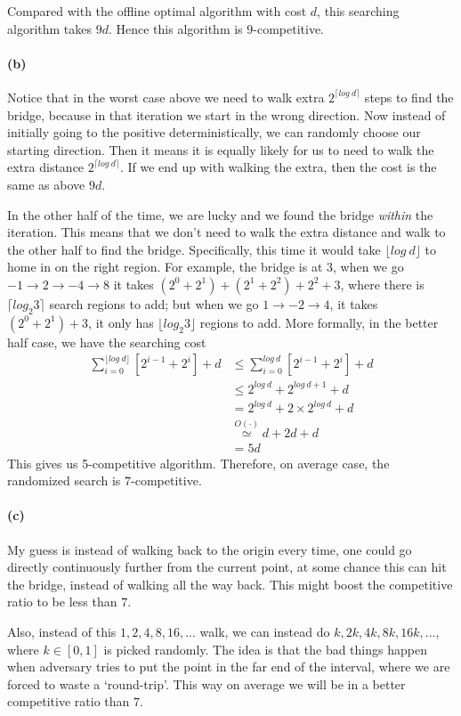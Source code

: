 \documentclass[12pt]{article}
\begin{document}
Compared with the offline optimal algorithm with cost $d$, this searching algorithm takes $9d$. Hence this algorithm is $9$-competitive.

\paragraph{(b)} Notice that in the worst case above we need to walk extra $2^{\lceil log\:d\rceil}$ steps to find the bridge, because in that iteration we start in the wrong direction. Now instead of initially going to the positive deterministically, we can randomly choose our starting direction. Then it means it is equally likely for us to need to walk the extra distance $2^{\lceil log\:d\rceil}$. If we end up with walking the extra, then the cost is the same as above $9d$. 

In the other half of the time, we are lucky and we found the bridge \emph{within} the iteration. This means that we don't need to walk the extra distance and walk to the other half to find the bridge. Specifically, this time it would take ${\lfloor log\:d\rfloor}$ to home in on the right region. For example, the bridge is at $3$, when we go $-1 \to 2 \to -4 \to 8$ it takes $(2^0 + 2^1 )+ ( 2^1 + 2^2) +2^2 + 3$, where there is $\lceil log_2 3\rceil$ search regions to add; but when we go $1 \to -2 \to 4$, it takes $(2^0 + 2^1) + 3$, it only has ${\lfloor log_2 3\rfloor}$ regions to add. More formally, in the better half case, we have the searching cost
\begin{align*}
\sum_{i=0}^{\lfloor log\:d\rfloor} \left[2^{i-1} + 2^{i}\right] + d &\leq \sum_{i=0}^{log\:d } \left[2^{i-1} + 2^{i}\right] + d\\
&\leq 2^{log\:d} + 2^{log\:d + 1} + d\\
&= 2^{log\:d} + 2\times 2^{log\:d} + d\\
&\stackrel{O(\cdot)}{\simeq} d + 2d + d \\
&= 5d
\end{align*}
This gives us 5-competitive algorithm. Therefore, on average case, the randomized search is $7$-competitive. 
\paragraph{(c)} My guess is instead of walking back to the origin every time, one could go directly continuously further from the current point, at some chance this can hit the bridge, instead of walking all the way back. This might boost the competitive ratio to be less than $7$. 

Also, instead of this $1, 2, 4, 8, 16, ...$ walk, we can instead do $k, 2k, 4k, 8k, 16k, ...$, where $k\in[0, 1]$ is picked randomly. The idea is that the bad things happen when adversary tries to put the point in the far end of the interval, where we are forced to waste a `round-trip'. This way on average we will be in a better competitive ratio than $7$.
\end{document}

